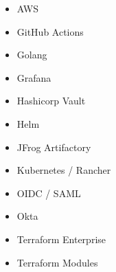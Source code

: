 \documentclass[10pt,letterpaper]{article}
\begin{document}
{{{\begin{multicols}{3}
        \begin{itemize}[left=0pt, labelsep=0.5em, itemindent=0pt, listparindent=\parindent, nosep]
          \item AWS
          \item GitHub Actions
          \item Golang
          \item Grafana
          \item Hashicorp Vault
          \item Helm
          \item JFrog Artifactory
          \item Kubernetes / Rancher
          \item OIDC / SAML
          \item Okta
          \item Terraform Enterprise
          \item Terraform Modules
        \end{itemize}
      \end{multicols}
    }
  }
}
\end{document}
